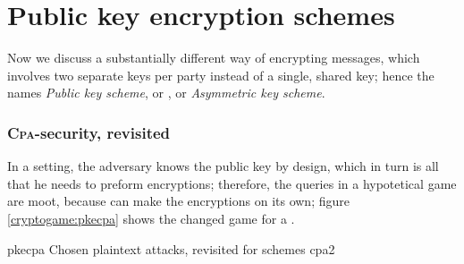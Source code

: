 \section{Public key encryption schemes}

Now we discuss a substantially different way of encrypting messages, which involves two separate keys per party instead of a single, shared key; hence the names \emph{Public key scheme}, or \pke{}, or \emph{Asymmetric key scheme}.


\subsubsection{\textsc{Cpa}-security, revisited}

In a \pke{} setting, the adversary knows the public key by design, which in turn is all that he needs to preform encryptions; therefore, the queries in a hypotetical \cpa{} game are moot, because \adversary{} can make the encryptions on its own; figure \ref{cryptogame:pkecpa} shows the changed game for a \pke{}.


\begin{cryptogame}
    {pkecpa}
    {Chosen plaintext attacks, revisited for \pke{} schemes}
    {cpa2}


    \cseqbeginloop
    \cseqendloop



    \cseqbeginloop
    \cseqendloop


\end{cryptogame}

